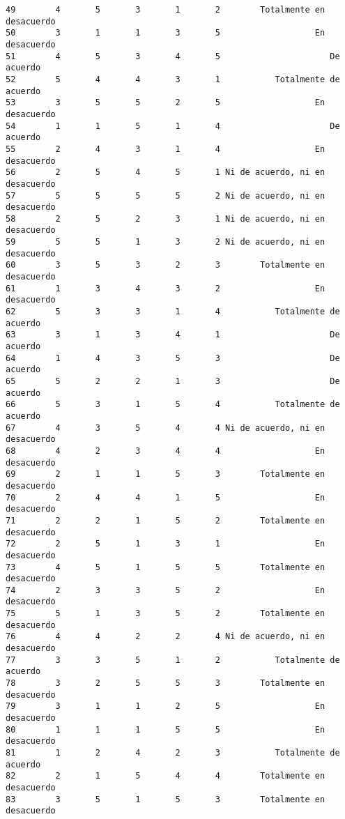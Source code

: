 \documentclass[
  letterpaper,
  DIV=11,
  numbers=noendperiod]{scrartcl}
\begin{document}
\begin{verbatim}
49        4       5       3       1       2        Totalmente en desacuerdo
50        3       1       1       3       5                   En desacuerdo
51        4       5       3       4       5                      De acuerdo
52        5       4       4       3       1           Totalmente de acuerdo
53        3       5       5       2       5                   En desacuerdo
54        1       1       5       1       4                      De acuerdo
55        2       4       3       1       4                   En desacuerdo
56        2       5       4       5       1 Ni de acuerdo, ni en desacuerdo
57        5       5       5       5       2 Ni de acuerdo, ni en desacuerdo
58        2       5       2       3       1 Ni de acuerdo, ni en desacuerdo
59        5       5       1       3       2 Ni de acuerdo, ni en desacuerdo
60        3       5       3       2       3        Totalmente en desacuerdo
61        1       3       4       3       2                   En desacuerdo
62        5       3       3       1       4           Totalmente de acuerdo
63        3       1       3       4       1                      De acuerdo
64        1       4       3       5       3                      De acuerdo
65        5       2       2       1       3                      De acuerdo
66        5       3       1       5       4           Totalmente de acuerdo
67        4       3       5       4       4 Ni de acuerdo, ni en desacuerdo
68        4       2       3       4       4                   En desacuerdo
69        2       1       1       5       3        Totalmente en desacuerdo
70        2       4       4       1       5                   En desacuerdo
71        2       2       1       5       2        Totalmente en desacuerdo
72        2       5       1       3       1                   En desacuerdo
73        4       5       1       5       5        Totalmente en desacuerdo
74        2       3       3       5       2                   En desacuerdo
75        5       1       3       5       2        Totalmente en desacuerdo
76        4       4       2       2       4 Ni de acuerdo, ni en desacuerdo
77        3       3       5       1       2           Totalmente de acuerdo
78        3       2       5       5       3        Totalmente en desacuerdo
79        3       1       1       2       5                   En desacuerdo
80        1       1       1       5       5                   En desacuerdo
81        1       2       4       2       3           Totalmente de acuerdo
82        2       1       5       4       4        Totalmente en desacuerdo
83        3       5       1       5       3        Totalmente en desacuerdo

\end{verbatim}
\end{document}
